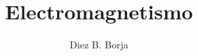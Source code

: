 \documentclass[letterpaper, onecolumn, 11pt]{report}
\begin{document}
\sffamily
\title{\Huge\textbf{{Electromagnetismo}}}
\author{Diez B. Borja}
\maketitle
\tableofcontents




\end{document}

